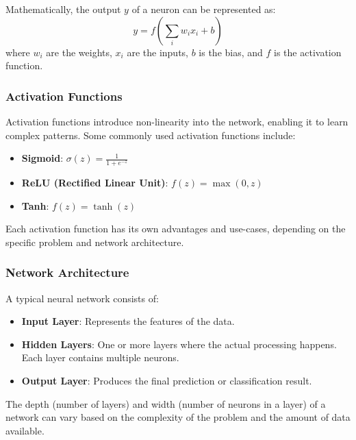 Mathematically, the output \( y \) of a neuron can be represented as:
\[ y = f\left( \sum_{i} w_i x_i + b \right) \]
where \( w_i \) are the weights, \( x_i \) are the inputs, \( b \) is the bias, and \( f \) is the activation function.

\subsubsection{Activation Functions}

Activation functions introduce non-linearity into the network, enabling it to learn complex patterns. Some commonly used activation functions include:

\begin{itemize}
    \item \textbf{Sigmoid}: \( \sigma(z) = \frac{1}{1 + e^{-z}} \)
    \item \textbf{ReLU (Rectified Linear Unit)}: \( f(z) = \max(0, z) \)
    \item \textbf{Tanh}: \( f(z) = \tanh(z) \)
\end{itemize}

Each activation function has its own advantages and use-cases, depending on the specific problem and network architecture.

\subsubsection{Network Architecture}

A typical neural network consists of:
\begin{itemize}
    \item \textbf{Input Layer}: Represents the features of the data.
    \item \textbf{Hidden Layers}: One or more layers where the actual processing happens. Each layer contains multiple neurons.
    \item \textbf{Output Layer}: Produces the final prediction or classification result.
\end{itemize}

The depth (number of layers) and width (number of neurons in a layer) of a network can vary based on the complexity of the problem and the amount of data available.


